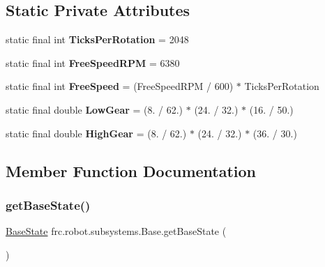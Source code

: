\subsection*{Static Private Attributes}
\begin{DoxyCompactItemize}
\item 
\mbox{\label{classfrc_1_1robot_1_1subsystems_1_1_base_abd90580cfbdb7a320a8724d0e90e4195}} 
static final int {\bfseries Ticks\+Per\+Rotation} = 2048
\item 
\mbox{\label{classfrc_1_1robot_1_1subsystems_1_1_base_a5b7c2fa864ece6512d10de93f3af4048}} 
static final int {\bfseries Free\+Speed\+R\+PM} = 6380
\item 
\mbox{\label{classfrc_1_1robot_1_1subsystems_1_1_base_ad78ed1856c2233b438263c9e9dade0dc}} 
static final int {\bfseries Free\+Speed} = (Free\+Speed\+R\+PM / 600) $\ast$ Ticks\+Per\+Rotation
\item 
\mbox{\label{classfrc_1_1robot_1_1subsystems_1_1_base_a340175600de15c03f88a6d360fdde144}} 
static final double {\bfseries Low\+Gear} = (8. / 62.) $\ast$ (24. / 32.) $\ast$ (16. / 50.)
\item 
\mbox{\label{classfrc_1_1robot_1_1subsystems_1_1_base_a3c564c2571a86e9a715e19183d4b2d29}} 
static final double {\bfseries High\+Gear} = (8. / 62.) $\ast$ (24. / 32.) $\ast$ (36. / 30.)
\end{DoxyCompactItemize}


\subsection{Member Function Documentation}
\mbox{\label{classfrc_1_1robot_1_1subsystems_1_1_base_ac08c09ed7a53f8c5ac883c4b0fe5fbf4}} 
\subsubsection{\texorpdfstring{getBaseState()}{getBaseState()}}
{\footnotesize\ttfamily \mbox{\hyperlink{enumfrc_1_1robot_1_1enums_1_1_base_state}{Base\+State}} frc.\+robot.\+subsystems.\+Base.\+get\+Base\+State (\begin{DoxyParamCaption}{ }\end{DoxyParamCaption})\hspace{0.3cm}{\ttfamily [inline]}}



